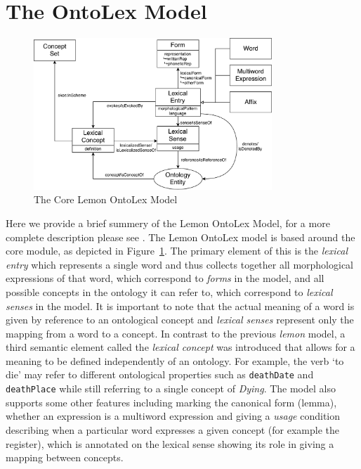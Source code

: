 \documentclass[12pt,a4paper]{elex2017}
\begin{document}
\section{The OntoLex Model}

\begin{figure}
    \begin{center}
\includegraphics[width=0.8\textwidth]{LemonOntoLexCore.pdf}
    \end{center}
\caption{\label{fig:core}The Core Lemon OntoLex Model}
\end{figure}

Here we provide a brief summery of the Lemon OntoLex Model, for a more complete
description please see \cite{cimiano2016lexicon}.
The Lemon OntoLex model is based around the core module, as depicted in
Figure~\ref{fig:core}. The primary element of this is the \emph{lexical entry}
which represents a single word and thus collects together all morphological
expressions of that word, which correspond to \emph{forms} in the model, and all
possible concepts in the ontology it can refer to, which correspond to
\emph{lexical senses} in the model. It is important to note that the actual
meaning of a word is given by reference to an ontological concept and
\emph{lexical senses} represent only the mapping from a word to a concept. In
contrast to the previous \emph{lemon} model, a third semantic element called the
\emph{lexical concept} was introduced that allows for a meaning to be defined
independently of an ontology. For example, the verb `to die' may refer to
different ontological properties such as \texttt{deathDate} and \texttt{deathPlace} while
still referring to a single concept of \emph{Dying}. The model also supports
some other features including marking the canonical form (lemma), whether an
expression is a multiword expression and giving a \emph{usage} condition
describing when a particular word expresses a given concept (for example the
register), which is annotated on the lexical sense showing its role in giving a
mapping between concepts.
\end{document}
